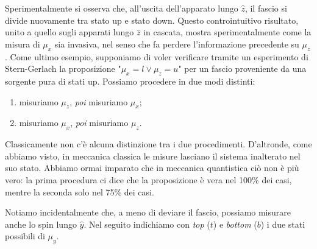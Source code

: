 \documentclass[a4paper, 11pt]{article}
\begin{document}
	\noindent Sperimentalmente si osserva che, all'uscita dell'apparato lungo $\hat{z}$, il fascio si divide nuovamente tra stato up e stato down. Questo controintuitivo risultato, unito a quello sugli apparati lungo $\hat{z}$ in cascata, mostra sperimentalmente come la misura di $\mu_x$ sia invasiva, nel senso che fa perdere l'informazione precedente su $\mu_z$. Come ultimo esempio, supponiamo di voler verificare tramite un esperimento di Stern-Gerlach la proposizione "$\mu_x=l\lor\mu_z=u$" per un fascio proveniente da una sorgente pura di stati up. Possiamo procedere in due modi distinti:
	\begin{enumerate}
		\item misuriamo $\mu_z$, \textit{poi} misuriamo $\mu_x$;
		\item misuriamo $\mu_x$, \textit{poi} misuriamo $\mu_z$.
	\end{enumerate}
	Classicamente non c'è alcuna distinzione tra i due procedimenti. D'altronde, come abbiamo visto, in meccanica classica le misure lasciano il sistema inalterato nel suo stato. Abbiamo ormai imparato che in meccanica quantistica ciò non è più vero: la prima procedura ci dice che la proposizione è vera nel 100\% dei casi, mentre la seconda solo nel 75\% dei casi.
	
	\noindent Notiamo incidentalmente che, a meno di deviare il fascio, possiamo misurare anche lo spin lungo $\hat{y}$. Nel seguito indichiamo con \textit{top} ($t$) e \textit{bottom} ($b$) i due stati possibili di $\mu_y$.
\end{document}
